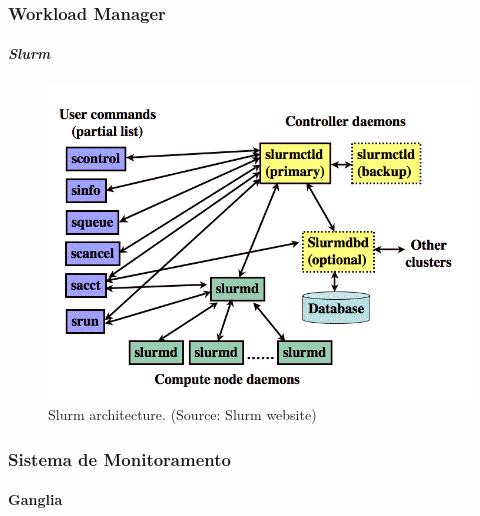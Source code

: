 \documentclass[svgnames,smaller,table]{beamer}
\begin{document}
\begin{frame}
  \frametitle{Workload Manager}
  \framesubtitle{\textit{Slurm}}
  \begin{figure}
  \centering\includegraphics[scale=0.35]{images/slurm-arch.png}
  \caption{Slurm architecture. (Source: Slurm website)}
  \end{figure}
\end{frame}

\begin{frame}
  \frametitle{Sistema de Monitoramento}
  \framesubtitle{Ganglia}
 
\end{frame}
\end{document}
